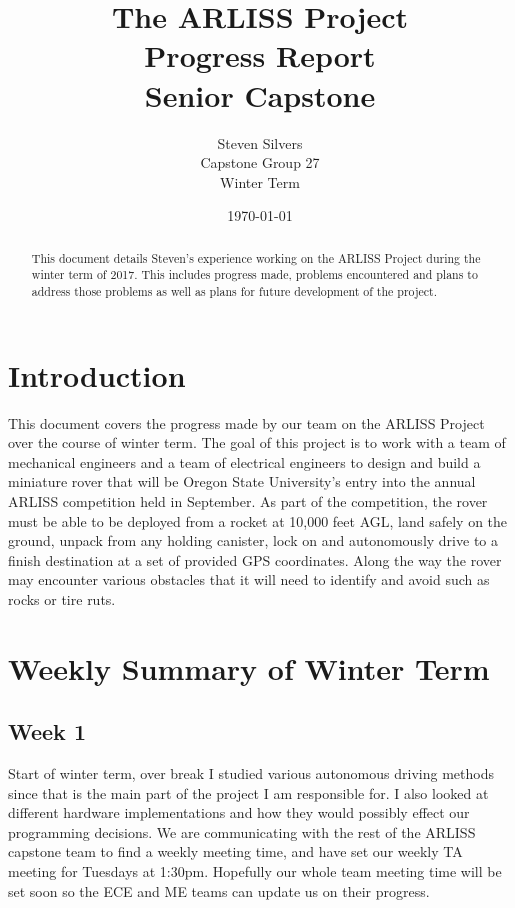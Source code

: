 \documentclass[10pt,letterpaper,onecolumn,draftclsnofoot,journal]{IEEEtran}
\begin{document}
\begin{titlepage}
	\title{The ARLISS Project\\Progress Report\\Senior Capstone}
	\author{Steven Silvers\\
		Capstone Group 27\\Winter Term}
	\date{\today}
	\maketitle
	\vspace{4cm}
	\begin{abstract}
		\noindent This document details Steven's experience working on the ARLISS Project during the winter term of 2017. This includes progress made, problems encountered and plans to address those problems as well as plans for future development of the project.
	\end{abstract}

\end{titlepage}
\tableofcontents
\clearpage

\section{Introduction}
\par
This document covers the progress made by our team on the ARLISS Project over the course of winter term. The goal of this project is to work with a team of mechanical engineers and a team of electrical engineers to design and build a miniature rover that will be Oregon State University's entry into the annual ARLISS competition held in September. As part of the competition, the rover must be able to be deployed from a rocket at 10,000 feet AGL, land safely on the ground, unpack from any holding canister, lock on and autonomously drive to a finish destination at a set of provided GPS coordinates. Along the way the rover may encounter various obstacles that it will need to identify and avoid such as rocks or tire ruts.




\section{Weekly Summary of Winter Term}


\subsection{Week 1}
Start of winter term, over break I studied various autonomous driving methods since that is the main part of the project I am responsible for. I also looked at different hardware implementations and how they would possibly effect our programming decisions. We are communicating with the rest of the ARLISS capstone team to find a weekly meeting time, and have set our weekly TA meeting for Tuesdays at 1:30pm. Hopefully our whole team meeting time will be set soon so the ECE and ME teams can update us on their progress.
\end{document}
